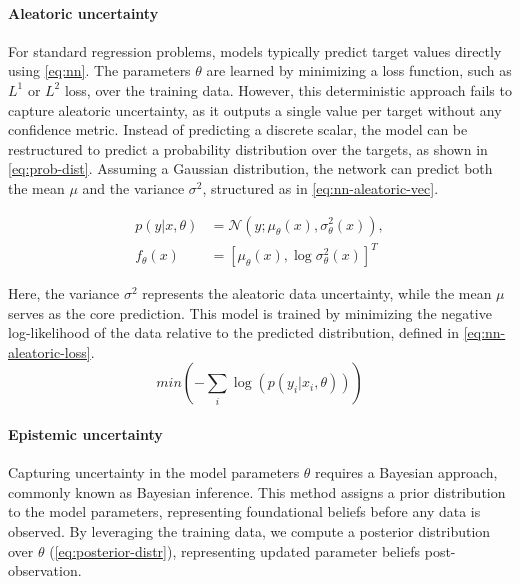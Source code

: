 \paragraph{Aleatoric uncertainty}\cite{src:scalable-bayesian-deep-learning}
For standard regression problems, models typically predict target values directly using \cref{eq:nn}.
The parameters $\theta$ are learned by minimizing a loss function, such as $L^1$ or $L^2$ loss, over the training data.
However, this deterministic approach fails to capture aleatoric uncertainty, as it outputs a single value per target without any confidence metric.
Instead of predicting a discrete scalar, the model can be restructured to predict a probability distribution over the targets, as shown in \cref{eq:prob-dist}.
Assuming a Gaussian distribution, the network can predict both the mean $\mu$ and the variance $\sigma^2$, structured as in \cref{eq:nn-aleatoric-vec}.

\begin{subequations}
\label{eq:nn-aleatoric}
    \begin{align}
        p(y|x, \theta) &= \mathcal{N}(y; \mu_{\theta}(x), \sigma^2_{\theta}(x)), \label{eq:prob-dist} \\
        f_\theta(x) &= [\mu_{\theta}(x), \log\sigma^2_{\theta}(x)]^T \label{eq:nn-aleatoric-vec}
    \end{align}
\end{subequations}

Here, the variance $\sigma^2$ represents the aleatoric data uncertainty, while the mean $\mu$ serves as the core prediction.
This model is trained by minimizing the negative log-likelihood of the data relative to the predicted distribution, defined in \cref{eq:nn-aleatoric-loss}.
\begin{equation}
    min(-\sum_{i} \log(p(y_i|x_i, \theta)))
    \label{eq:nn-aleatoric-loss}
\end{equation}

\paragraph{Epistemic uncertainty}\cite{src:scalable-bayesian-deep-learning}\cite{src:bayesian-deep-learning-epistemic}
Capturing uncertainty in the model parameters $\theta$ requires a Bayesian approach, commonly known as Bayesian inference.
This method assigns a prior distribution to the model parameters, representing foundational beliefs before any data is observed.
By leveraging the training data, we compute a posterior distribution over $\theta$ (\cref{eq:posterior-distr}), representing updated parameter beliefs post-observation.

